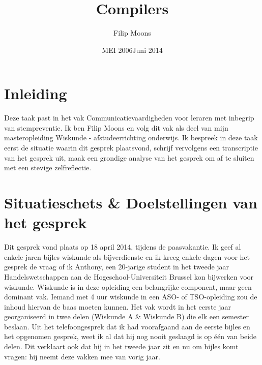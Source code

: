 \documentclass[a4paper,12pt]{article}
\author{Filip Moons}
\title{Compilers}
\date{MEI 2006}
\date{Juni 2014}
\theoremstyle{definition}
\begin{document}
\maketitlepage


\tableofcontents
\newpage
\section{Inleiding}
Deze taak past in het vak Communicatievaardigheden voor leraren met inbegrip van 
stempreventie. Ik ben Filip Moons en volg dit vak als deel van mijn masteropleiding Wiskunde - afstudeerrichting onderwijs. 
Ik bespreek in deze taak eerst de situatie waarin dit gesprek plaatsvond, 
schrijf vervolgens een transcriptie van het gesprek uit, maak een grondige 
analyse van het gesprek om af te sluiten met een stevige zelfreflectie.
\newpage
\section{Situatieschets \& Doelstellingen van het gesprek}
Dit gesprek vond plaats op 18 april 2014, tijdens de paasvakantie. Ik geef al 
enkele jaren bijles wiskunde als bijverdienste en ik kreeg enkele dagen voor het 
gesprek de vraag of ik Anthony, een 20-jarige student in het tweede jaar Handelswetschappen aan de 
Hogeschool-Universiteit Brussel kon bijwerken voor wiskunde. Wiskunde is in deze 
opleiding een belangrijke component, maar geen dominant vak. Iemand met 4 uur 
wiskunde in een ASO- of TSO-opleiding zou de inhoud hiervan de baas moeten 
kunnen. Het vak wordt in het eerste jaar georganiseerd in twee delen (Wiskunde A \& Wiskunde B) 
die elk een semester beslaan. Uit het telefoongesprek dat ik had voorafgaand aan de eerste bijles en het opgenomen gesprek,
weet ik al dat hij nog nooit geslaagd is op één van beide delen. Dit verklaart ook dat hij in het tweede jaar zit en nu om bijles komt vragen: hij neemt
deze vakken mee van vorig jaar. \\
\end{document}
